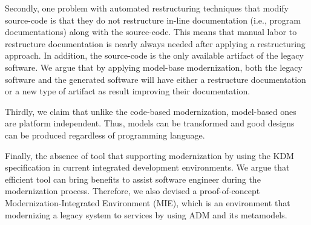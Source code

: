 \documentclass[a4paper,twoside]{article}
\begin{document}



Secondly, one problem with automated restructuring techniques that modify source-code is that they do not restructure in-line documentation (i.e., program documentations) along with the source-code. This means that manual labor to restructure documentation is nearly always needed after applying a restructuring approach. In addition, the source-code is the only available artifact of the legacy software. We argue that by applying model-base modernization, both the legacy software and the generated software will have either a restructure documentation or a new type of artifact as result improving their documentation.


Thirdly, we claim that unlike the code-based modernization, model-based ones are platform independent. Thus, models can be transformed and good designs can be produced regardless of programming language. 

Finally, the absence of tool that supporting modernization by using the KDM specification in current integrated development environments. We argue that efficient tool can bring benefits to assist software engineer during the modernization process. Therefore, we also devised a proof-of-concept Modernization-Integrated Environment (MIE), which is an environment that modernizing a legacy system to services by using ADM and its metamodels.
\end{document}
